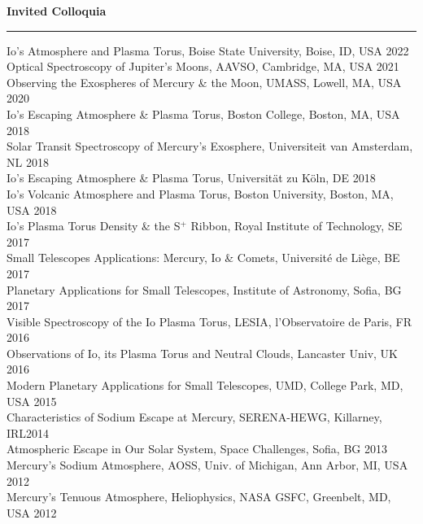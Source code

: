 \documentclass[12pt]{report}
\begin{document}
\noindent\bf{Invited Colloquia}\rm \hspace*{\fill} \\
\rule{\textwidth}{1pt}
\noindent Io's Atmosphere and Plasma Torus, Boise State University, Boise, ID, USA \hfill 2022\\
\noindent Optical Spectroscopy of Jupiter's Moons, AAVSO, Cambridge, MA, USA \hfill 2021\\
\noindent Observing the Exospheres of Mercury \& the Moon, UMASS, Lowell, MA, USA \hfill 2020\\
\noindent Io's Escaping Atmosphere \& Plasma Torus, Boston College, Boston, MA, USA \hfill 2018\\
\noindent Solar Transit Spectroscopy of Mercury's Exosphere, Universiteit van Amsterdam, NL \hfill 2018\\
\noindent Io's Escaping Atmosphere \& Plasma Torus, Universit\"at zu K\"oln, DE \hfill 2018\\
\noindent Io's Volcanic Atmosphere and Plasma Torus, Boston University, Boston, MA, USA \hfill 2018\\
\noindent Io's Plasma Torus Density \& the S$^+$ Ribbon, Royal Institute of Technology, SE \hfill 2017\\
\noindent Small Telescopes Applications: Mercury, Io \& Comets, Universit\'e de Li\`ege, BE \hfill 2017\\
\noindent Planetary Applications for Small Telescopes, Institute of Astronomy, Sofia, BG \hfill 2017\\
\noindent Visible Spectroscopy of the Io Plasma Torus, LESIA, l'Observatoire de Paris, FR \hfill 2016\\
\noindent Observations of Io, its Plasma Torus and Neutral Clouds, Lancaster Univ, UK \hfill 2016\\
\noindent Modern Planetary Applications for Small Telescopes, UMD, College Park, MD, USA \hfill 2015\\
\noindent Characteristics of Sodium Escape at Mercury, SERENA-HEWG, Killarney, IRL\hfill 2014\\
\noindent Atmospheric Escape in Our Solar System, Space Challenges, Sofia, BG \hfill 2013\\
\noindent Mercury's Sodium Atmosphere, AOSS, Univ. of Michigan, Ann Arbor, MI, USA \hfill 2012\\
\noindent Mercury's Tenuous Atmosphere, Heliophysics, NASA GSFC, Greenbelt, MD, USA \hfill 2012\\
\end{document}
